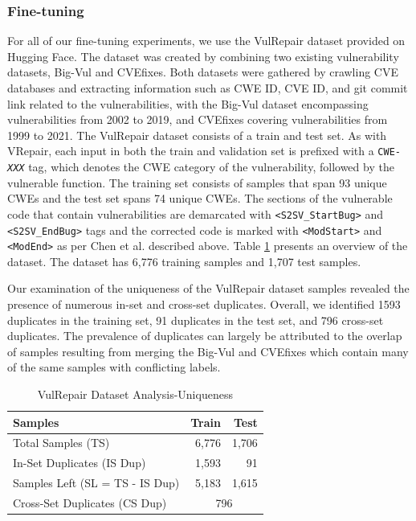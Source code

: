 \subsubsection{Fine-tuning}
For all of our fine-tuning experiments, we use the VulRepair \cite{fu2022vulrepair} dataset provided on Hugging Face\cite{VulRepair-HuggingFace}.
The dataset was created by combining two existing vulnerability datasets, Big-Vul\cite{fan2020ac} and CVEfixes\cite{bhandari2021cvefixes}.
Both datasets were gathered by crawling CVE databases and extracting information such as CWE ID, CVE ID, and git commit link related to the vulnerabilities, with the Big-Vul dataset encompassing vulnerabilities from 2002 to 2019, and CVEfixes covering vulnerabilities from 1999 to 2021.
The VulRepair dataset consists of a train and test set.
As with VRepair, each input in both the train and validation set is prefixed with a \texttt{CWE-\emph{XXX}} tag, which denotes the CWE category of the vulnerability, followed by the vulnerable function.
The training set consists of samples that span 93 unique CWEs and the test set spans 74 unique CWEs.
The sections of the vulnerable code that contain vulnerabilities are demarcated with \texttt{<S2SV\_StartBug>} and \texttt{<S2SV\_EndBug>} tags and the corrected code is marked with \texttt{<ModStart>} and \texttt{<ModEnd>} as per Chen et al. described above.
Table \ref{Methodology:VulRepair-dataset-Unique} presents an overview of the dataset.
The dataset has 6,776 training samples and 1,707 test samples.

Our examination of the uniqueness of the VulRepair dataset samples revealed the presence of numerous in-set and cross-set duplicates.
Overall, we identified 1593 duplicates in the training set, 91 duplicates in the test set, and 796 cross-set duplicates.
The prevalence of duplicates can largely be attributed to the overlap of samples resulting from merging the Big-Vul and CVEfixes which contain many of the same samples with conflicting labels.
%
\begin{table}[h]
\centering
  \caption{VulRepair Dataset Analysis-Uniqueness}
  \label{Methodology:VulRepair-dataset-Unique}
  \begin{tabular}{|l|r|r|}
    \hline
    Samples &Train &Test\\
    \hline
    Total Samples (TS)                                  &6,776  &1,706\\
    \hline
    In-Set Duplicates (IS Dup)                          &1,593  &91\\
    \hline
    Samples Left (SL = TS - IS Dup)                     &5,183  &1,615\\
    \hline
    {Cross-Set Duplicates (CS Dup)}  & \multicolumn{2}{c|}{796}\\
  \hline
\end{tabular}
\end{table}
%


